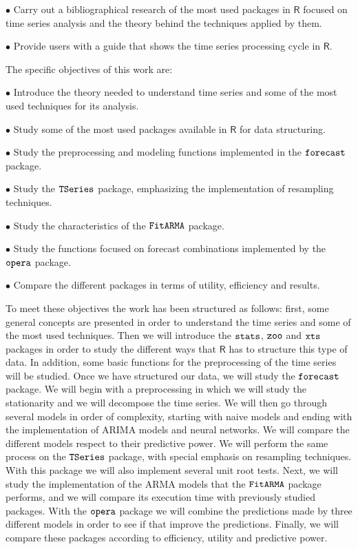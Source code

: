 \documentclass[12pt,a4paper,oneside]{article}
\begin{document}
\begin{itemize*}
  \item[$\bullet$]Carry out a bibliographical research of the most used packages in $\textsf{R}$ focused on time series analysis and the theory behind the techniques applied by them.
  \item[$\bullet$]Provide users with a guide that shows the time series processing cycle in $\textsf{R}$.
\end{itemize*}

The specific objectives of this work are:

\begin{itemize*}
  \item[$\bullet$]Introduce the theory needed to understand time series and some of the most used techniques for its analysis.
  \item[$\bullet$]Study some of the most used packages available in $\textsf{R}$ for data structuring.
  \item[$\bullet$]Study the preprocessing and modeling functions implemented in the $\verb!forecast!$ package.
  \item[$\bullet$]Study the $\verb!TSeries!$ package, emphasizing the implementation of resampling techniques.
  \item[$\bullet$]Study the characteristics of the $\verb!FitARMA!$ package.
  \item[$\bullet$]Study the functions focused on forecast combinations implemented by the $\verb!opera!$ package.
  \item[$\bullet$]Compare the different packages in terms of utility, efficiency and results.
\end{itemize*}

To meet these objectives the work has been structured as follows: first, some general concepts are presented in order to understand the time series and some of the most used techniques. Then we will introduce the $\verb!stats!$, $\verb!zoo!$ and $\verb!xts!$ packages in order to study the different ways that $\textsf{R}$ has to structure this type of data. In addition, some basic functions for the preprocessing of the time series will be studied. Once we have structured our data, we will study the $\verb!forecast!$ package. We will begin with a preprocessing in which we will study the stationarity and we will decompose the time series. We will then go through several models in order of complexity, starting with naive models and ending with the implementation of ARIMA models and neural networks. We will compare the different models respect to their predictive power. We will perform the same process on the $\verb!TSeries!$ package, with special emphasis on resampling techniques. With this package we will also implement several unit root tests. Next, we will study the implementation of the ARMA models that the $\verb!FitARMA!$ package performs, and we will compare its execution time with previously studied packages. With the $\verb!opera!$ package we will combine the predictions made by three different models in order to see if that improve the predictions. Finally, we will compare these packages according to efficiency, utility and predictive power.
\end{document}
